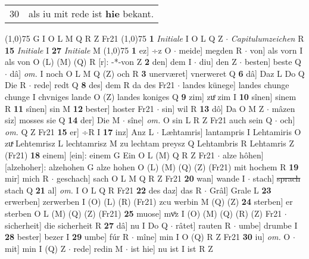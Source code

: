 \documentclass[8pt,a4paper,notitlepage]{article}
\begin{document}
\begin{table}[ht]
\begin{minipage}[t]{0.5\linewidth}
\begin{tabular}{rl}
30 & als iu mit rede ist \textbf{hie} bekant.\\ 
\end{tabular}
\scriptsize
\line(1,0){75} \newline
G I O L M Q R Z Fr21 \newline
\line(1,0){75} \newline
\textbf{1} \textit{Initiale} I O L Q Z   $\cdot$ \textit{Capitulumzeichen} R  \textbf{15} \textit{Initiale} I  \textbf{27} \textit{Initiale} M  \newline
\line(1,0){75} \newline
\textbf{1} ez] ÷z O  $\cdot$ meide] megden R  $\cdot$ von] als vorn I als von O (L) (M) (Q) R [r]: -*-von Z \textbf{2} den] dem I  $\cdot$ diu] den Z  $\cdot$ besten] beste Q  $\cdot$ dâ] \textit{om.} I noch O L M Q (Z) och R \textbf{3} unerværet] vnerweret Q \textbf{6} dâ] Daz L Do Q Die R  $\cdot$ rede] redt Q \textbf{8} des] dem R da des Fr21  $\cdot$ landes künege] landes chunge chunge I chvniges lande O (Z) landes koniges Q \textbf{9} zim] zuͤ zim I \textbf{10} sînen] sinem R \textbf{11} sînen] sin M \textbf{12} bester] hoster Fr21  $\cdot$ sin] wil R \textbf{13} dô] Da O M Z  $\cdot$ mâzen siz] mosses sie Q \textbf{14} der] Die M  $\cdot$ sîne] \textit{om.} O sin L R Z Fr21 auch sein Q  $\cdot$ och] \textit{om.} Q Z Fr21 \textbf{15} er] ÷R I \textbf{17} inz] Anz L  $\cdot$ Læhtamris] lantampris I Lehtamiris O zuͯ Lehtemrisz L lechtamrisz M zu lechtam preysz Q Lehtambris R Lehtamris Z (Fr21) \textbf{18} einem] [ein]: einem G Ein O L (M) Q R Z Fr21  $\cdot$ alze hôhen] [alzehoher]: alzehohen G alze hohen O (L) (M) (Q) (Z) (Fr21) mit hochem R \textbf{19} mir] mich R  $\cdot$ geschach] sach O L M Q R Z Fr21 \textbf{20} wan] wande I  $\cdot$ stach] \sout{sprach} stach Q \textbf{21} al] \textit{om.} I O L Q R Fr21 \textbf{22} des daz] das R  $\cdot$ Grâl] Grale L \textbf{23} erwerben] zerwerben I (O) (L) (R) (Fr21) zcu werbin M (Q) (Z) \textbf{24} sterben] er sterben O L (M) (Q) (Z) (Fr21) \textbf{25} muose] mvͦz I (O) (M) (Q) (R) (Z) Fr21  $\cdot$ sicherheit] die sicherheit R \textbf{27} dâ] nu I Do Q  $\cdot$ râtet] rauten R  $\cdot$ umbe] drumbe I \textbf{28} bester] bezer I \textbf{29} umbe] fúr R  $\cdot$ mîne] min I O (Q) R Z Fr21 \textbf{30} iu] \textit{om.} O  $\cdot$ mit] min I (Q) Z  $\cdot$ rede] redin M  $\cdot$ ist hie] nu ist I ist R Z \newline
\end{minipage}
\hspace{0.5cm}
\begin{minipage}[t]{0.5\linewidth}

\end{minipage}
\end{table}
\end{document}
